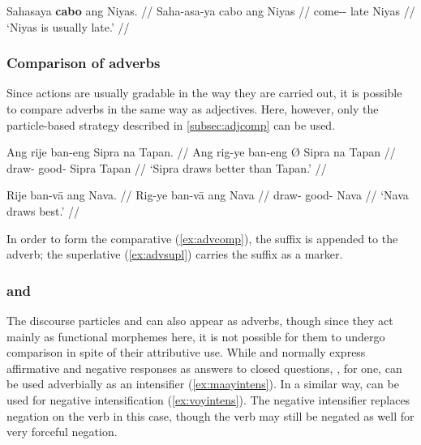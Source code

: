 \a\label{ex:attradv}\begingl
	\gla Sahasaya \textbf{cabo} ang Niyas. //
	\glb Saha-asa-ya cabo ang Niyas //
	\glc come-\Hab{}-\TsgM{} late \Aarg{} Niyas //
	\glft `Niyas is usually late.' //
\endgl

\xe

\subsubsection{Comparison of adverbs}

Since actions are usually gradable in the way they are carried out, it is 
possible to compare adverbs in the same way as adjectives. Here, however, only 
the particle-based strategy described in \autoref{subsec:adjcomp} 
can be used.

\pex
\a\label{ex:advcomp}\begingl
	\gla Ang rije ban-eng {} Sipra na Tapan. //
	\glb Ang rig-ye ban-eng Ø Sipra na Tapan //
	\glc \AgtT{} draw-\TsgF{} good-\Comp{} \Top{} Sipra \Gen{} Tapan //
	\glft `Sipra draws better than Tapan.' //
\endgl

\a\label{ex:advsupl}\begingl
	\gla Rije ban-vā ang Nava. //
	\glb Rig-ye ban-vā ang Nava //
	\glc draw-\TsgF{} good-\Supl{} \Aarg{} Nava //
	\glft `Nava draws best.' //
\endgl
\xe


In order to form the comparative (\ref{ex:advcomp}), the suffix 
 is appended to the adverb; the superlative (\ref{ex:advsupl}) 
carries the suffix  as a marker.

\subsubsection{ and }

The discourse particles  and  can 
also appear as adverbs, though since they act mainly as functional morphemes 
here, it is not possible for them to undergo comparison in spite of their 
attributive use. While  and  normally 
express affirmative and negative responses as answers to closed questions, 
, for one, can be used adverbially as an intensifier 
(\ref{ex:maayintens}). In a similar way,  can be used for 
negative intensification (\ref{ex:voyintens}). The negative intensifier 
replaces negation on the verb in this case, though the verb may still be 
negated as well for very forceful negation.

